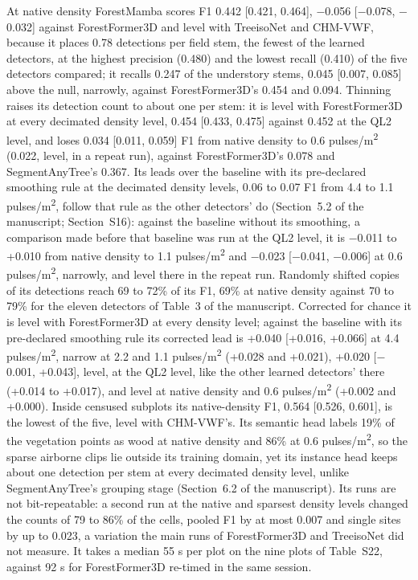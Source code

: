 \documentclass[10pt,a4paper]{article}
\begin{document}
At native density ForestMamba scores F1 0.442 [0.421, 0.464], $-$0.056 [$-$0.078,
$-$0.032] against ForestFormer3D and level with TreeisoNet and CHM-VWF, because it
places 0.78 detections per field stem, the fewest of the learned detectors, at
the highest precision (0.480) and the lowest recall (0.410) of the five
detectors compared; it recalls 0.247 of the understory stems, 0.045 [0.007,
0.085] above the null, narrowly, against ForestFormer3D's 0.454 and 0.094.
Thinning raises its detection count to about one per stem: it is level with
ForestFormer3D at every decimated density level, 0.454 [0.433, 0.475] against
0.452 at the QL2 level, and loses 0.034 [0.011, 0.059] F1 from native density to
0.6 pulses/m\textsuperscript{2} (0.022, level, in a repeat run), against ForestFormer3D's 0.078
and SegmentAnyTree's 0.367. Its leads over the baseline with its pre-declared
smoothing rule at the decimated density levels, 0.06 to 0.07 F1 from 4.4 to 1.1
pulses/m\textsuperscript{2}, follow that rule as the other detectors' do (Section~5.2 of the
manuscript; Section~S16): against the baseline without its smoothing, a
comparison made before that baseline was run at the QL2 level, it is $-$0.011 to
+0.010 from native density to 1.1 pulses/m\textsuperscript{2} and $-$0.023 [$-$0.041, $-$0.006] at 0.6
pulses/m\textsuperscript{2}, narrowly, and level there in the repeat run. Randomly shifted copies
of its detections reach 69 to 72\% of its F1, 69\% at native density against 70 to
79\% for the eleven detectors of Table~3 of the manuscript. Corrected for chance
it is level with ForestFormer3D at every density level; against the baseline
with its pre-declared smoothing rule its corrected lead is +0.040 [+0.016,
+0.066] at 4.4 pulses/m\textsuperscript{2}, narrow at 2.2 and 1.1 pulses/m\textsuperscript{2} (+0.028 and +0.021),
+0.020 [$-$0.001, +0.043], level, at the QL2 level, like the other learned
detectors' there (+0.014 to +0.017), and level at native density and 0.6
pulses/m\textsuperscript{2} (+0.002 and +0.000). Inside censused subplots its native-density F1,
0.564 [0.526, 0.601], is the lowest of the five, level with CHM-VWF's. Its
semantic head labels 19\% of the vegetation points as wood at native density and
86\% at 0.6 pulses/m\textsuperscript{2}, so the sparse airborne clips lie outside its training
domain, yet its instance head keeps about one detection per stem at every
decimated density level, unlike SegmentAnyTree's grouping stage (Section~6.2 of
the manuscript). Its runs are not bit-repeatable: a second run at the native and
sparsest density levels changed the counts of 79 to 86\% of the cells, pooled F1
by at most 0.007 and single sites by up to 0.023, a variation the main runs of
ForestFormer3D and TreeisoNet did not measure. It takes a median 55 s per plot
on the nine plots of Table~S22, against 92 s for ForestFormer3D re-timed in the
same session.
\end{document}
